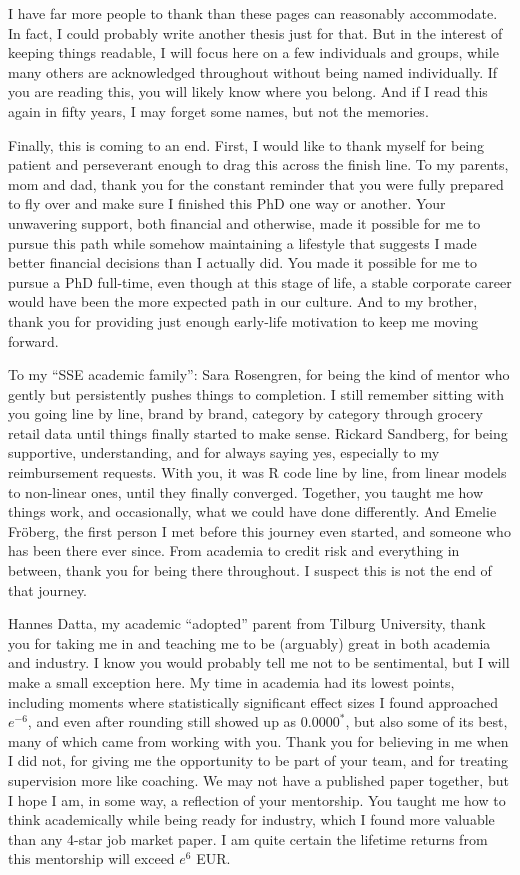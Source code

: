I have far more people to thank than these pages can reasonably accommodate. In fact, I could probably write another thesis just for that. But in the interest of keeping things readable, I will focus here on a few individuals and groups, while many others are acknowledged throughout without being named individually. If you are reading this, you will likely know where you belong. And if I read this again in fifty years, I may forget some names, but not the memories.

Finally, this is coming to an end. First, I would like to thank myself for being patient and perseverant enough to drag this across the finish line. To my parents, mom and dad, thank you for the constant reminder that you were fully prepared to fly over and make sure I finished this PhD one way or another. Your unwavering support, both financial and otherwise, made it possible for me to pursue this path while somehow maintaining a lifestyle that suggests I made better financial decisions than I actually did. You made it possible for me to pursue a PhD full-time, even though at this stage of life, a stable corporate career would have been the more expected path in our culture. And to my brother, thank you for providing just enough early-life motivation to keep me moving forward.

To my “SSE academic family”: Sara Rosengren, for being the kind of mentor who gently but persistently pushes things to completion. I still remember sitting with you going line by line, brand by brand, category by category through grocery retail data until things finally started to make sense. Rickard Sandberg, for being supportive, understanding, and for always saying yes, especially to my reimbursement requests. With you, it was R code line by line, from linear models to non-linear ones, until they finally converged. Together, you taught me how things work, and occasionally, what we could have done differently. And Emelie Fröberg, the first person I met before this journey even started, and someone who has been there ever since. From academia to credit risk and everything in between, thank you for being there throughout. I suspect this is not the end of that journey.

Hannes Datta, my academic “adopted” parent from Tilburg University, thank you for taking me in and teaching me to be (arguably) great in both academia and industry. I know you would probably tell me not to be sentimental, but I will make a small exception here. My time in academia had its lowest points, including moments where statistically significant effect sizes I found approached $e^{-6}$, and even after rounding still showed up as $0.0000^*$, but also some of its best, many of which came from working with you. Thank you for believing in me when I did not, for giving me the opportunity to be part of your team, and for treating supervision more like coaching. We may not have a published paper together, but I hope I am, in some way, a reflection of your mentorship. You taught me how to think academically while being ready for industry, which I found more valuable than any 4-star job market paper. I am quite certain the lifetime returns from this mentorship will exceed $e^6$  EUR.


